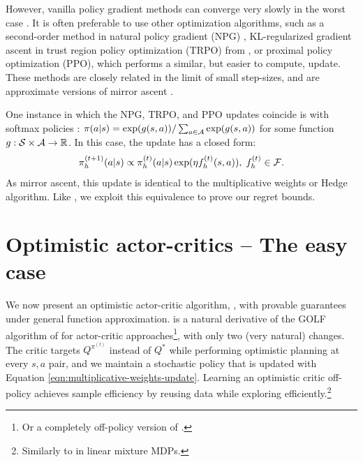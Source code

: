 However, vanilla policy gradient methods can converge very slowly in the worst case \citep{li2021softmax}. It is often preferable to use other optimization algorithms, such as a second-order method in natural policy gradient (NPG) \citep{kakade2001natural}, KL-regularized gradient ascent in trust region policy optimization (TRPO) from \citet{schulman2015trust}, or proximal policy optimization (PPO), which performs a similar, but easier to compute, update. 
These methods are closely related in the limit of small step-sizes, and are approximate versions of mirror ascent \citep{schulman2015trust, neu2017unified, rajeswaran2017learning}.

One instance in which the NPG, TRPO, and PPO updates coincide is with softmax policies \citep{cai2020provably, cen2022fast, agarwal2021theory}: $\pi(a|s) = \exp(g(s,a))/\sum_{a \in {\mathcal{A}}} \exp(g(s,a))$ for some function $g : {\mathcal{S}} \times {\mathcal{A}} \to {\mathbb{R}}$. In this case, the update has a closed form: 
\begin{equation}\pi_h^{(t+1)}(a|s)\propto \pi_h^{(t)}(a|s)\exp(\eta f_h^{(t)}(s,a)), \;f_h^{(t)} \in {\mathcal{F}}.
\label{eqn:multiplicative-weights-update}
\end{equation}
As mirror ascent, this update is identical to the multiplicative weights or Hedge algorithm. Like \citet{cai2020provably, zhong2023theoretical, liu2023optimistic}, we exploit this equivalence to prove our regret bounds. 


\section{Optimistic actor-critics -- The easy case}
\label{sec:douhua-easy}
We now present an optimistic actor-critic algorithm, , with provable guarantees under general function approximation.  is a natural derivative of the GOLF algorithm of \citet{jin2021bellmaneluder} for actor-critic approaches\footnote{Or a completely off-policy version of \citet{liu2023optimistic}.}, with only two (very natural) changes. The critic targets $Q^{\pi^{(t)}}$ instead of $Q^*$ while performing optimistic planning at every $s,a$ pair, and we maintain a stochastic policy that is updated with Equation \ref{eqn:multiplicative-weights-update}. Learning an optimistic critic off-policy achieves sample efficiency by reusing data while exploring efficiently.\footnote{Similarly to \citet{cai2020provably} in linear mixture MDPs.}


